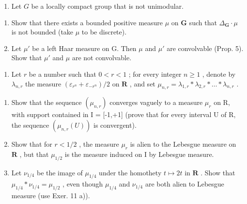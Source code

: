 \begin{enumerate}
\def\labelenumi{\arabic{enumi})}
\setcounter{enumi}{11}
\tightlist
\item
  Let \(G\) be a locally compact group that is not unimodular.
\end{enumerate}

\begin{enumerate}
\def\labelenumi{\alph{enumi})}
\item
  Show that there exists a bounded positive measure \(\mu\) on \(\mathbf{G}\) such that \(\Delta_{\mathbf{G}} \cdot \mu\) is not bounded (take \(\mu\) to be discrete).
\item
  Let \(\mu'\) be a left Haar measure on G. Then \(\mu\) and \(\mu'\) are convolvable (Prop. 5). Show that \(\mu'\) and \(\mu\) are not convolvable.
\end{enumerate}

\begin{enumerate}
\def\labelenumi{\arabic{enumi})}
\setcounter{enumi}{12}
\tightlist
\item
  Let \(r\) be a number such that \(0 < r < 1\) ; for every integer \(n \geqslant 1\) , denote by \(\lambda_{n,r}\) the measure \((\varepsilon_{r^n} + \varepsilon_{-r^n}) / 2\) on \(\mathbf{R}\) , and set \(\mu_{n,r} = \lambda_{1,r} * \lambda_{2,r} * \dots * \lambda_{n,r}\) .
\end{enumerate}

\begin{enumerate}
\def\labelenumi{\alph{enumi})}
\item
  Show that the sequence \((\mu_{n,r})\) converges vaguely to a measure \(\mu_{r}\) on R, with support contained in I = {[}-1,+1{]} (prove that for every interval U of R, the sequence \((\mu_{n,r}(U))\) is convergent).
\item
  Show that for \(r < 1/2\) , the measure \(\mu_r\) is alien to the Lebesgue measure on \(\mathbf{R}\) , but that \(\mu_{1/2}\) is the measure induced on I by Lebesgue measure.
\item
  Let \(\nu_{1/4}\) be the image of \(\mu_{1/4}\) under the homothety \(t \mapsto 2t\) in \(\mathbf{R}\) . Show that \(\mu_{1/4} * \nu_{1/4} = \mu_{1/2}\) , even though \(\mu_{1/4}\) and \(\nu_{1/4}\) are both alien to Lebesgue measure (use Exer. 11 a)).
\end{enumerate}

